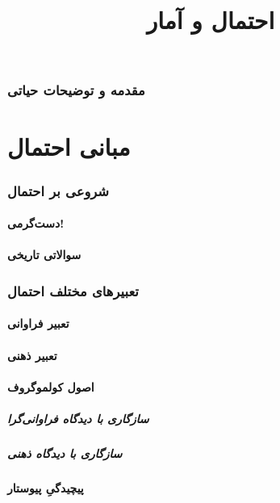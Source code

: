 \documentclass{article}
\title{احتمال و آمار}
\author{}
\begin{document}
\maketitle
\tableofcontents
\newpage

\section{مقدمه و توضیحات حیاتی}
\part{مبانی احتمال}

\section{شروعی بر احتمال}
\subsection{دست‌گرمی!}
\subsection{سوالاتی تاریخی}


\section{تعبیرهای مختلف احتمال}
\subsection{تعبیر فراوانی}
\subsection{تعبیر ذهنی}
\subsection{اصول کولموگروف}
\subsubsection{سازگاری با دیدگاه فراوانی‌گرا}
\subsubsection{سازگاری با دیدگاه ذهنی}
\subsection{پیچیدگیِ پیوستار}
\end{document}
